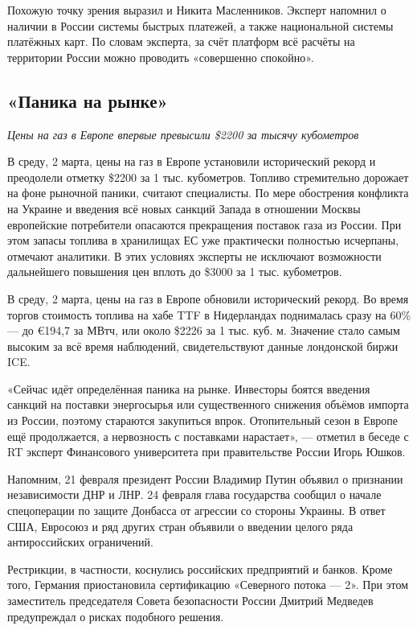 Похожую точку зрения выразил и Никита Масленников. Эксперт напомнил о наличии в России системы быстрых платежей, а также национальной системы платёжных карт. По словам эксперта, за счёт платформ всё расчёты на территории России можно проводить «совершенно спокойно».


\subsection{«Паника на рынке»}
\textit{Цены на газ в Европе впервые превысили \$2200 за тысячу кубометров}

В среду, 2 марта, цены на газ в Европе установили исторический рекорд и преодолели отметку \$2200 за 1 тыс. кубометров. Топливо стремительно дорожает на фоне рыночной паники, считают специалисты. По мере обострения конфликта на Украине и введения всё новых санкций Запада в отношении Москвы европейские потребители опасаются прекращения поставок газа из России. При этом запасы топлива в хранилищах ЕС уже практически полностью исчерпаны, отмечают аналитики. В этих условиях эксперты не исключают возможности дальнейшего повышения цен вплоть до \$3000 за 1 тыс. кубометров.

В среду, 2 марта, цены на газ в Европе обновили исторический рекорд. Во время торгов стоимость топлива на хабе TTF в Нидерландах поднималась сразу на 60\% --- до \euro{}194,7 за МВтч, или около \$2226 за 1 тыс. куб. м. Значение стало самым высоким за всё время наблюдений, свидетельствуют данные лондонской биржи ICE.

\begin{fancyquotes}
    «Сейчас идёт определённая паника на рынке. Инвесторы боятся введения санкций на поставки энергосырья или существенного снижения объёмов импорта из России, поэтому стараются закупиться впрок. Отопительный сезон в Европе ещё продолжается, а нервозность с поставками нарастает», --- отметил в беседе с RT эксперт Финансового университета при правительстве России Игорь Юшков.
\end{fancyquotes}

Напомним, 21 февраля президент России Владимир Путин объявил о признании независимости ДНР и ЛНР. 24 февраля глава государства сообщил о начале спецоперации по защите Донбасса от агрессии со стороны Украины. В ответ США, Евросоюз и ряд других стран объявили о введении целого ряда антироссийских ограничений.

Рестрикции, в частности, коснулись российских предприятий и банков. Кроме того, Германия приостановила сертификацию «Северного потока --- 2». При этом заместитель председателя Совета безопасности России Дмитрий Медведев предупреждал о рисках подобного решения.

